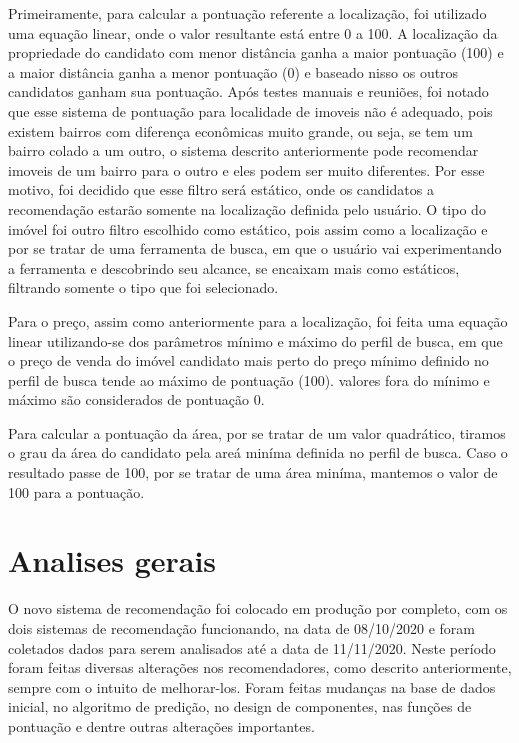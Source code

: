 Primeiramente, para calcular a pontuação referente a localização, foi utilizado uma equação linear, onde o valor resultante está entre 0 a 100. A localização da propriedade do candidato com menor distância ganha a maior pontuação (100) e a maior distância ganha a menor pontuação (0) e baseado nisso os outros candidatos ganham sua pontuação. Após testes manuais e reuniões, foi notado que esse sistema de pontuação para localidade de imoveis não é adequado, pois existem bairros com diferença econômicas muito grande, ou seja, se tem um bairro colado a um outro, o sistema descrito anteriormente pode recomendar imoveis de um bairro para o outro e eles podem ser muito diferentes. Por esse motivo, foi decidido que esse filtro será estático, onde os candidatos a recomendação estarão somente na localização definida pelo usuário. O tipo do imóvel foi outro filtro escolhido como estático, pois assim como a localização e por se tratar de uma ferramenta de busca, em que o usuário vai experimentando a ferramenta e descobrindo seu alcance, se encaixam mais como estáticos, filtrando somente o tipo que foi selecionado.

Para o preço, assim como anteriormente para a localização, foi feita uma equação linear utilizando-se dos parâmetros mínimo e máximo do perfil de busca, em que o preço de venda do imóvel candidato mais perto do preço mínimo definido no perfil de busca tende ao máximo de pontuação (100). valores fora do mínimo e máximo são considerados de pontuação 0.

Para calcular a pontuação da área, por se tratar de um valor quadrático, tiramos o grau da área do candidato pela areá miníma definida no perfil de busca. Caso o resultado passe de 100, por se tratar de uma área miníma, mantemos o valor de 100 para a pontuação.

\section{Analises gerais}
\label{analise_gerais}

O novo sistema de recomendação foi colocado em produção por completo, com os dois sistemas de recomendação funcionando, na data de 08/10/2020 e foram coletados dados para serem analisados até a data de 11/11/2020. Neste período foram feitas diversas alterações nos recomendadores, como descrito anteriormente, sempre com o intuito de melhorar-los. Foram feitas mudanças na base de dados inicial, no algoritmo de predição, no design de componentes, nas funções de pontuação e dentre outras alterações importantes.

